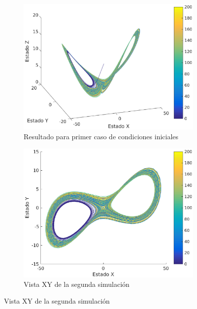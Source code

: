 \documentclass[12pt,letterpaper]{article}
\begin{document}
\begin{figure}
	\centering
	\begin{subfigure}[b]{0.36\textwidth}
		\includegraphics[width=\textwidth]{pictures/segunda_simulacion}
		\caption{Resultado para primer caso de condiciones iniciales}
		\label{fig:simulacion2}
	\end{subfigure}
	\begin{subfigure}[b]{0.36\textwidth}
		\includegraphics[width=\textwidth]{pictures/segunda_simulacion_xy}
		\caption{Vista XY de la segunda simulación}
		\label{fig:simulacion2xy}

\end{subfigure}
\end{figure}
\end{document}

